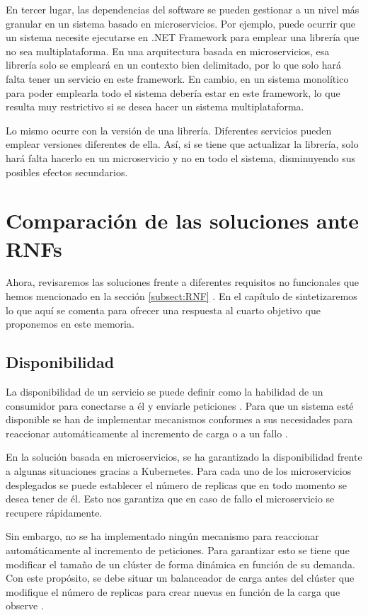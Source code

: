 \documentclass[11pt,spanish,listoffigures]{tfgetsinf}
\begin{document}
En tercer lugar, las dependencias del software se pueden gestionar a un nivel más granular en un sistema basado en microservicios. Por ejemplo, puede ocurrir que un sistema necesite ejecutarse en .NET Framework para emplear una librería que no sea multiplataforma. En una arquitectura basada en microservicios, esa librería solo se empleará en un contexto bien delimitado, por lo que solo hará falta tener un servicio en este framework. En cambio, en un sistema monolítico para poder emplearla todo el sistema debería estar en este framework, lo que resulta muy restrictivo si se desea hacer un sistema multiplataforma.

Lo mismo ocurre con la versión de una librería. Diferentes servicios pueden emplear versiones diferentes de ella. Así, si se tiene que actualizar la librería, solo hará falta hacerlo en un microservicio y no en todo el sistema, disminuyendo sus posibles efectos secundarios.

\section{Comparación de las soluciones ante RNFs}

Ahora, revisaremos las soluciones frente a diferentes requisitos no funcionales que hemos mencionado en la sección \ref{subsect:RNF} . En el capítulo de  sintetizaremos lo que aquí se comenta para ofrecer una respuesta al cuarto objetivo que proponemos en este memoria.

\subsection{Disponibilidad}

La disponibilidad de un servicio se puede definir como la habilidad de un consumidor para conectarse a él y enviarle peticiones \cite{Richards2016}. Para que un sistema esté disponible se han de implementar mecanismos conformes a sus necesidades para reaccionar automáticamente al incremento de carga o a un fallo \cite{Newman2015a}.

En la solución basada en microservicios, se ha garantizado la disponibilidad frente a algunas situaciones gracias a Kubernetes. Para cada uno de los microservicios desplegados se puede establecer el número de replicas que en todo momento se desea tener de él. Esto nos garantiza que en caso de fallo el microservicio se recupere rápidamente. 

Sin embargo, no se ha implementado ningún mecanismo para reaccionar automáticamente al incremento de peticiones. Para garantizar esto se tiene que modificar el tamaño de un clúster de forma dinámica en función de su demanda. Con este propósito, se debe situar un balanceador de carga antes del clúster que modifique el número de replicas para crear nuevas en función de la carga que observe \cite{Rensin2015}.
\end{document}
